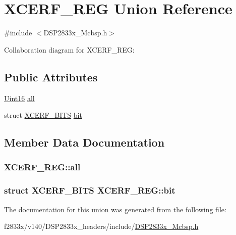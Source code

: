 \hypertarget{union_x_c_e_r_f___r_e_g}{}\section{X\+C\+E\+R\+F\+\_\+\+R\+E\+G Union Reference}
\label{union_x_c_e_r_f___r_e_g}


{\ttfamily \#include $<$D\+S\+P2833x\+\_\+\+Mcbsp.\+h$>$}



Collaboration diagram for X\+C\+E\+R\+F\+\_\+\+R\+E\+G\+:
\subsection*{Public Attributes}
\begin{DoxyCompactItemize}
\item 
\hyperlink{_d_s_p2833x___device_8h_a59a9f6be4562c327cbfb4f7e8e18f08b}{Uint16} \hyperlink{union_x_c_e_r_f___r_e_g_af13b753de56671037714b1c879ee8187}{all}
\item 
struct \hyperlink{struct_x_c_e_r_f___b_i_t_s}{X\+C\+E\+R\+F\+\_\+\+B\+I\+T\+S} \hyperlink{union_x_c_e_r_f___r_e_g_a3fab8db5eee4d5236d950f2573a14a58}{bit}
\end{DoxyCompactItemize}


\subsection{Member Data Documentation}
\hypertarget{union_x_c_e_r_f___r_e_g_af13b753de56671037714b1c879ee8187}{}
\subsubsection[{all}]{ X\+C\+E\+R\+F\+\_\+\+R\+E\+G\+::all}\label{union_x_c_e_r_f___r_e_g_af13b753de56671037714b1c879ee8187}
\hypertarget{union_x_c_e_r_f___r_e_g_a3fab8db5eee4d5236d950f2573a14a58}{}
\subsubsection[{bit}]{\setlength{\rightskip}{0pt plus 5cm}struct {\bf X\+C\+E\+R\+F\+\_\+\+B\+I\+T\+S} X\+C\+E\+R\+F\+\_\+\+R\+E\+G\+::bit}\label{union_x_c_e_r_f___r_e_g_a3fab8db5eee4d5236d950f2573a14a58}


The documentation for this union was generated from the following file\+:\begin{DoxyCompactItemize}
\item 
f2833x/v140/\+D\+S\+P2833x\+\_\+headers/include/\hyperlink{_d_s_p2833x___mcbsp_8h}{D\+S\+P2833x\+\_\+\+Mcbsp.\+h}\end{DoxyCompactItemize}

